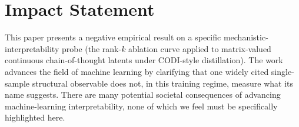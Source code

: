 \section*{Impact Statement}

This paper presents a negative empirical result on a specific
mechanistic-interpretability probe (the rank-$k$ ablation curve
applied to matrix-valued continuous chain-of-thought latents under
CODI-style distillation). The work advances the field of machine
learning by clarifying that one widely cited single-sample
structural observable does not, in this training regime, measure
what its name suggests. There are many potential societal
consequences of advancing machine-learning interpretability, none
of which we feel must be specifically highlighted here.
